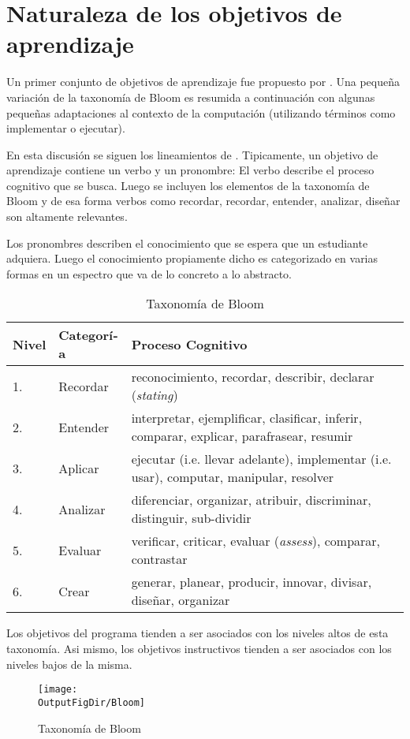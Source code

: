 \section{Naturaleza de los objetivos de aprendizaje}
Un primer conjunto de objetivos de aprendizaje fue propuesto por \cite{Bloom56Taxonomy}. 
Una pequeña variación de la taxonomí­a de Bloom es resumida a continuación con algunas 
pequeñas adaptaciones al contexto de la computación (utilizando términos como implementar o ejecutar).

En esta discusión se siguen los lineamientos de \cite{Anderson2001Bloom}. 
Tipicamente, un objetivo de aprendizaje contiene un verbo y un pronombre:
El verbo describe el proceso cognitivo que se busca. Luego se incluyen los 
elementos de la taxonomí­a de Bloom y de esa forma verbos como 
recordar, recordar, entender, analizar, diseñar son altamente relevantes.

Los pronombres describen el conocimiento que se espera que un estudiante adquiera. Luego el conocimiento 
propiamente dicho es categorizado en varias formas en un espectro que va de lo concreto a lo abstracto.

\begin{center}
\begin{table}[h!]
\begin{tabularx}{\textwidth}{|l|l|X|}\hline
\textbf{Nivel} & \textbf{Categorí­a}      & \textbf{Proceso Cognitivo} \\ \hline
1.     & Recordar 	& reconocimiento, recordar, describir, declarar (\textit{stating}) \\ \hline
2.     & Entender 	& interpretar, ejemplificar, clasificar, inferir, comparar, explicar, parafrasear, resumir \\ \hline
3.     & Aplicar        & ejecutar (i.e. llevar adelante), implementar (i.e. usar), computar, manipular, resolver \\ \hline
4.     & Analizar      	& diferenciar, organizar, atribuir, discriminar, distinguir, sub-dividir \\ \hline 
5.     & Evaluar     	& verificar, criticar, evaluar (\textit{assess}), comparar, contrastar \\ \hline
6.     & Crear       	& generar, planear, producir, innovar, divisar, diseñar, organizar \\ \hline
\end{tabularx}
\label{tab:BloomTaxonomy}
\caption{Taxonomí­a de Bloom}
\end{table}
\end{center}

Los objetivos del programa tienden a ser asociados con los niveles altos de esta taxonomí­a. Asi mismo, 
los objetivos instructivos tienden a ser asociados con los niveles bajos de la misma.

\begin{figure}[h!]
\texttt{[image: \\OutputFigDir/Bloom]}
\label{fig:BloomTaxonomy}
\caption{Taxonomí­a de Bloom}
\end{figure} 
